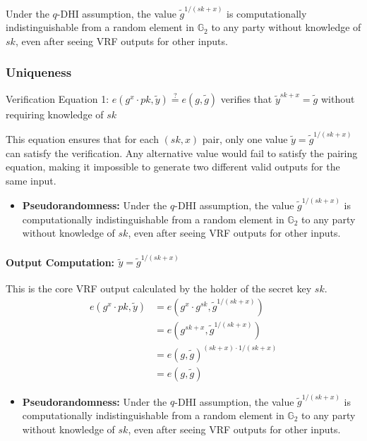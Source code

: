 Under the $q$-DHI assumption, the value $\tilde{g}^{1/(sk+x)}$ is computationally indistinguishable from a random element in $\mathbb{G}_2$ to any party without knowledge of $sk$, even after seeing VRF outputs for other inputs.


\subsubsection*{Uniqueness}
 Verification Equation 1: $e(g^{x} \cdot pk, \tilde{y}) \stackrel{?}{=} e(g, \tilde{g})$ verifies that $\tilde{y}^{sk+x} = \tilde{g}$ without requiring knowledge of $sk$

This equation ensures that for each $(sk,x)$ pair, only one value $\tilde{y} = \tilde{g}^{1/(sk+x)}$ can satisfy the verification. Any alternative value would fail to satisfy the pairing equation, making it impossible to generate two different valid outputs for the same input.












\begin{itemize}
    \item \textbf{Pseudorandomness:} Under the $q$-DHI assumption, the value $\tilde{g}^{1/(sk+x)}$ is computationally indistinguishable from a random element in $\mathbb{G}_2$ to any party without knowledge of $sk$, even after seeing VRF outputs for other inputs.
\end{itemize}

\paragraph{Output Computation: $\tilde{y} = \tilde{g}^{1/(sk + x)}$}
This is the core VRF output calculated by the holder of the secret key $sk$.
\begin{align*}
    e(g^{x} \cdot pk, \tilde{y}) &= e(g^{x} \cdot g^{sk}, \tilde{g}^{1/(sk + x)}) \\
    &= e(g^{sk + x}, \tilde{g}^{1/(sk + x)}) \\
    &= e(g, \tilde{g})^{(sk + x) \cdot 1/(sk + x)} \\
    &= e(g, \tilde{g})
\end{align*}

\begin{itemize}
    \item \textbf{Pseudorandomness:} Under the $q$-DHI assumption, the value $\tilde{g}^{1/(sk+x)}$ is computationally indistinguishable from a random element in $\mathbb{G}_2$ to any party without knowledge of $sk$, even after seeing VRF outputs for other inputs.
\end{itemize}

